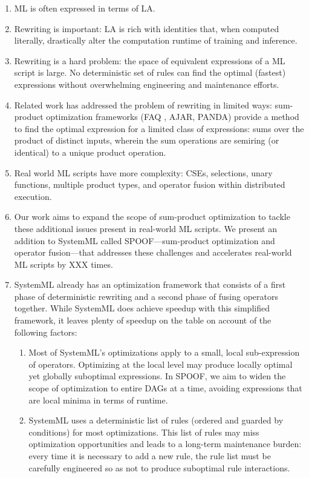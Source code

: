 \documentclass{vldb}
\begin{document}
\begin{enumerate}
\item ML is often expressed in terms of LA.
\item Rewriting is important: LA is rich with identities that, when computed literally, drastically alter the computation runtime of training and inference. 
\item Rewriting is a hard problem: the space of equivalent expressions of a ML script is large.  No deterministic set of rules can find the optimal (fastest) expressions without overwhelming engineering and maintenance efforts.
\item Related work has addressed the problem of rewriting in limited ways: sum-product optimization frameworks (FAQ \cite{KhamisNR16}, AJAR, PANDA) provide a method to find the optimal expression for a limited class of expressions: sums over the product of distinct inputs, wherein the sum operations are semiring (or identical) to a unique product operation.
\item Real world ML scripts have more complexity: CSEs, selections, unary functions, multiple product types, and operator fusion within distributed execution.
\item Our work aims to expand the scope of sum-product optimization to tackle these additional issues present in real-world ML scripts. We present an addition to SystemML called SPOOF---sum-product optimization and operator fusion---that addresses these challenges and accelerates real-world ML scripts by XXX times.
\item SystemML already has an optimization framework that consists of a first phase of deterministic rewriting and a second phase of fusing operators together. While SystemML does achieve speedup with this simplified framework, it leaves plenty of speedup on the table on account of the following factors:
  \begin{enumerate}
  \item Most of SystemML's optimizations apply to a small, local sub-expression of operators. Optimizing at the local level may produce locally optimal yet globally suboptimal expressions. In SPOOF, we aim to widen the scope of optimization to entire DAGs at a time, avoiding expressions that are local minima in terms of runtime.
  \item SystemML uses a deterministic list of rules (ordered and guarded by conditions) for most optimizations. This list of rules may miss optimization opportunities and leads to a long-term maintenance burden: every time it is necessary to add a new rule, the rule list must be carefully engineered so as not to produce suboptimal rule interactions.


\end{enumerate}
\end{enumerate}
\end{document}
